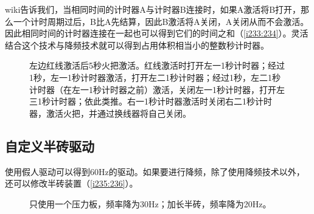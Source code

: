 wiki告诉我们，当相同时间的计时器A与计时器B连接时，如果A激活将B打开，那么一个计时周期过后，B比A先结算，因此B激活将A关闭，A关闭从而不会激活。因此相同时间的计时器连接在一起也可以得到它们的时间之和（\autoref{i233:234}）。灵活结合这个技术与降频技术就可以得到占用体积相当小的整数秒计时器。

\begin{figure}[!ht]
\begin{center}
\qquad
{}
\end{center}
\caption{左边红线激活后5秒火把激活。红线激活时打开左一1秒计时器；经过1秒，左一1秒计时器激活，打开左二1秒计时器；经过1秒，左二1秒计时器（在左一1秒计时器之前）激活，关闭左一1秒计时器，打开左三1秒计时器；依此类推。右一1秒计时器激活时关闭右二1秒计时器，激活火把，并通过换线器将自己关闭。}
\label{i233:234}
\end{figure}

\subsection{自定义半砖驱动}
使用假人驱动可以得到60Hz的驱动。如果要进行降频，除了使用降频技术以外，还可以修改半砖装置（\autoref{i235:236}）。

\begin{figure}[!ht]
\begin{center}
\qquad
{}
\end{center}
\caption{\protect{}只使用一个压力板，频率降为30Hz；\protect{}加长半砖，频率降为20Hz。}
\label{i235:236}
\end{figure}

